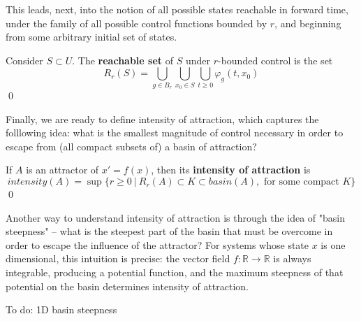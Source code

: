 
This leads, next, into the notion of all possible states reachable in forward time, under the family of all possible control functions bounded by $r$, and beginning from some arbitrary initial set of states.  

\begin{definition}
	Consider $S\subset  U$. The \textbf{reachable set} of $S$ under $r$-bounded control is the set
	$$R_r(S) =  \bigcup\limits_{g \in B_r} \bigcup\limits_{x_0 \in S} \bigcup\limits_{t \geq 0}  \varphi_g(t,x_0)$$ \qed
\end{definition}

Finally, we are ready to define intensity of attraction, which captures the folllowing idea: what is the smallest magnitude of control necessary in order to escape from (all compact subsets of) a basin of attraction? 

\begin{definition}
	If $A$ is an attractor of $x' = f(x)$, then its \textbf{intensity of attraction} is 
	$$intensity(A) = \sup\{ r \geq 0 ~|~ R_r(A) \subset K \subset basin(A), \text{ for some compact }K \}$$ \qed
\end{definition}

Another way to understand intensity of attraction is through the idea of "basin steepness" -- what is the steepest part of the basin that must be overcome in order to escape the influence of the attractor? For systems whose state $x$ is one dimensional, this intuition is precise: the vector field $f: \mathbb{R} \to \mathbb{R}$ is always integrable, producing a potential function, and the maximum steepness of that potential on the basin determines intensity of attraction. 

\begin{proposition}
	To do: 1D basin steepness
\end{proposition}

